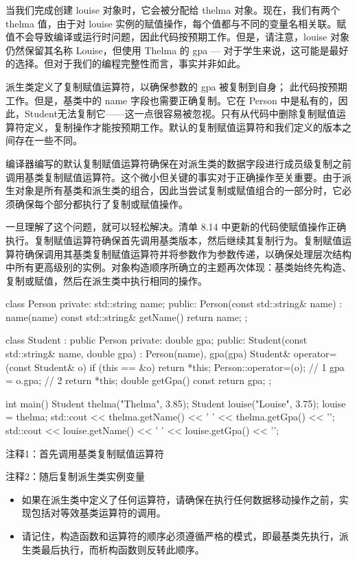 
当我们完成创建 louise 对象时，它会被分配给 thelma 对象。现在，我们有两个 thelma 值，由于对 louise 实例的赋值操作，每个值都与不同的变量名相关联。赋值不会导致编译或运行时问题，因此代码按预期工作。但是，请注意，louise 对象仍然保留其名称 Louise，但使用 Thelma 的 gpa — 对于学生来说，这可能是最好的选择。但对于我们的编程完整性而言，事实并非如此。

派生类定义了复制赋值运算符，以确保参数的 gpa 被复制到自身； 此代码按预期工作。但是，基类中的 name 字段也需要正确复制。它在 Person 中是私有的，因此，Student无法复制它——这一点很容易被忽视。只有从代码中删除复制赋值运算符定义，复制操作才能按预期工作。默认的复制赋值运算符和我们定义的版本之间存在一些不同。

编译器编写的默认复制赋值运算符确保在对派生类的数据字段进行成员级复制之前调用基类复制赋值运算符。这个微小但关键的事实对于正确操作至关重要。由于派生对象是所有基类和派生类的组合，因此当尝试复制或赋值组合的一部分时，它必须确保每个部分都执行了复制或赋值操作。


一旦理解了这个问题，就可以轻松解决。清单 8.14 中更新的代码使赋值操作正确执行。复制赋值运算符确保首先调用基类版本，然后继续其复制行为。复制赋值运算符确保调用其基类复制赋值运算符并将参数作为参数传递，以确保处理层次结构中所有更高级别的实例。对象构造顺序所确立的主题再次体现：基类始终先构造、复制或赋值，然后在派生类中执行相同的操作。


\begin{cpp}
class Person {
private:
  std::string name;
  public:
  Person(const std::string& name) : name(name) {}
  const std::string& getName() { return name; }
};

class Student : public Person {
private:
  double gpa;
public:
  Student(const std::string& name, double gpa) : Person(name), gpa(gpa) {}
  Student& operator=(const Student& o) {
    if (this == &o)
      return *this;
    Person::operator=(o); // 1
    gpa = o.gpa; // 2
    return *this;
  }
  double getGpa() const { return gpa; }
};

int main() {
  Student thelma("Thelma", 3.85);
  Student louise("Louise", 3.75);
  louise = thelma;
  std::cout << thelma.getName() << ' ' << thelma.getGpa() << '\n';
  std::cout << louise.getName() << ' ' << louise.getGpa() << '\n';
}
\end{cpp}

{\footnotesize
注释1：首先调用基类复制赋值运算符

注释2：随后复制派生类实例变量
}


\begin{itemize}
\item
如果在派生类中定义了任何运算符，请确保在执行任何数据移动操作之前，实现包括对等效基类运算符的调用。

\item
请记住，构造函数和运算符的顺序必须遵循严格的模式，即最基类先执行，派生类最后执行，而析构函数则反转此顺序。
\end{itemize}














